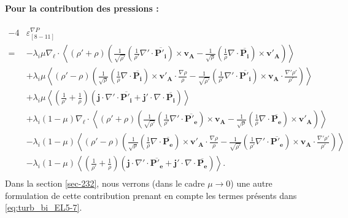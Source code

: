 \paragraph{Pour la contribution des pressions :} 
\begin{equation}\begin{array}{rl}
  \label{eq:turb_bin_TEMP} - 4&  \varepsilon^{\nabla P}_{[8-11]} \\%
  =&- \lambda_i\mu \nabla_{\boldsymbol{\ell}} \cdot \left< \left(\rho' + \rho\right) \left(\frac{1}{\sqrt{\rho'}}\left(\frac{1}{\rho'}\nabla' \cdot \overline{\boldsymbol{P'_i}}\right)\times \boldsymbol{v_A} - \frac{1}{\sqrt{\rho}} \left(\frac{1}{\rho}\nabla \cdot \overline{\boldsymbol{P_i}}\right)\times \boldsymbol{v'_A}\right)\right> \\%
  &+\lambda_i\mu  \left<\left(\rho' - \rho\right) \left(\frac{1}{\sqrt{\rho}}\left( \frac{1}{\rho}\nabla \cdot \overline{\boldsymbol{P_i}}\right)\times \boldsymbol{v'_A} \cdot \frac{\nabla  \rho }{\rho}-\frac{1}{\sqrt{\rho'}}\left(\frac{1}{\rho'}\nabla' \cdot \overline{\boldsymbol{P'_i}} \right)\times \boldsymbol{v_A} \cdot \frac{\nabla'  \rho' }{\rho'}\right)\right> \\%
  &+\lambda_i\mu \left< \left(\frac{1}{\rho'} + \frac{1}{\rho}\right)  \left(\boldsymbol{j} \cdot\nabla' \cdot \overline{\boldsymbol{P'_i}}+ \boldsymbol{j'} \cdot  \nabla \cdot \overline{\boldsymbol{P_i}}\right)\right> \\%
    &+\lambda_i \left(1-\mu\right) \nabla_{\boldsymbol{\ell}} \cdot \left< \left(\rho' + \rho\right) \left(\frac{1}{\sqrt{\rho'}}\left(\frac{1}{\rho'}\nabla' \cdot \overline{\boldsymbol{P'_e}}\right)\times \boldsymbol{v_A} - \frac{1}{\sqrt{\rho}}\left(\frac{1}{\rho}\nabla \cdot \overline{\boldsymbol{P_e}}\right)\times \boldsymbol{v'_A}\right)\right> \\%
  &-\lambda_i \left(1-\mu\right) \left<\left(\rho' - \rho\right) \left(\frac{1}{\sqrt{\rho}}\left(\frac{1}{\rho}\nabla \cdot \overline{\boldsymbol{P_e}}\right)\times \boldsymbol{v'_A} \cdot \frac{\nabla  \rho }{\rho}-\frac{1}{\sqrt{\rho'}}\left(\frac{1}{\rho'} \nabla' \cdot \overline{\boldsymbol{P'_e}}\right)\times \boldsymbol{v_A} \cdot \frac{\nabla'  \rho' }{\rho'}\right)\right> \\%
  &-\lambda_i \left(1-\mu\right) \left< \left(\frac{1}{\rho'} + \frac{1}{\rho}\right) \left(\boldsymbol{j} \cdot \nabla' \cdot \overline{\boldsymbol{P'_e}} + \boldsymbol{j'} \cdot \nabla \cdot \overline{\boldsymbol{P_e}}\right) \right>. \\%
\end{array}\end{equation}
Dans la section \ref{sec-232}, nous verrons (dans le cadre $\mu \rightarrow 0$) une autre formulation de cette contribution prenant en compte les termes présents dans \eqref{eq:turb_bi_EL5-7}. 
